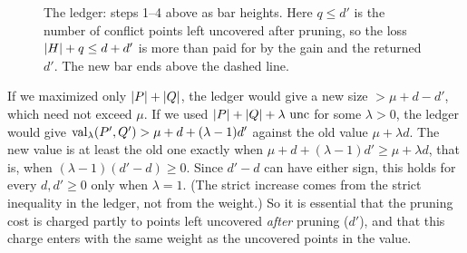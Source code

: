 \begin{figure}[ht]
\centering
{}
\caption{The ledger: steps 1--4 above as bar heights. Here $q\le d'$ is the
number of conflict points left uncovered after pruning, so the loss
$\lvert H\rvert+q\le d+d'$ is more than paid for by the gain and the returned $d'$.
The new bar ends above the dashed line.}
\label{fig:ledger}
\end{figure}

\begin{remark}\label{rem:why-value}
If we maximized only $\lvert P\rvert+\lvert Q\rvert$, the ledger would give a new size
$>\mu+d-d'$, which need not exceed $\mu$. If we used $\lvert P\rvert+\lvert Q\rvert+\lambda\,\operatorname{unc}$
for some $\lambda>0$, the ledger would give $\operatorname{val}_\lambda(P',Q')>\mu+d+(\lambda-1)d'$
against the old value $\mu+\lambda d$. The new value is at least the old one
exactly when $\mu+d+(\lambda-1)d'\ge\mu+\lambda d$, that is, when
$(\lambda-1)(d'-d)\ge0$. Since $d'-d$ can have either sign, this holds for
every $d,d'\ge0$ only when $\lambda=1$. (The strict increase comes from the
strict inequality in the ledger, not from the weight.) So it is essential that the pruning cost is charged partly
to points left uncovered \emph{after} pruning ($d'$), and that this charge
enters with the same weight as the uncovered points in the value.
\end{remark}

